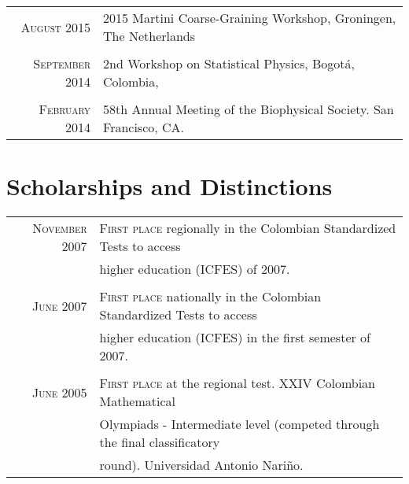 \documentclass[a4paper,10pt]{article} %
\begin{document}
\begin{tabular}{rl}

\textsc{August 2015} & 2015 Martini Coarse-Graining Workshop, Groningen, The Netherlands \\
&\\

\textsc{September 2014} &  2nd Workshop on Statistical Physics, Bogotá, Colombia, \\
&\\

\textsc{February 2014} &  58th Annual Meeting of the Biophysical Society. San Francisco, CA. \\

\end{tabular}



\color{OrangeRed}
\section{Scholarships and Distinctions}
\color{black}

\begin{tabular}{rl}

\textsc{November} 2007 & \textsc{First place} regionally in the Colombian Standardized Tests to access \\ 
& higher education (ICFES) of 2007. \\ 
&\\

\textsc{June} 2007 & \textsc{First place} nationally in the Colombian Standardized Tests to access  \\ 
& higher education (ICFES) in the first semester of 2007. \\ 
&\\

\textsc{June } 2005 & \textsc{First place} at the regional test. XXIV Colombian Mathematical\\ 
& Olympiads - Intermediate level (competed through the final classificatory \\ & round). Universidad Antonio Nariño.\\

\end{tabular}
\end{document}
